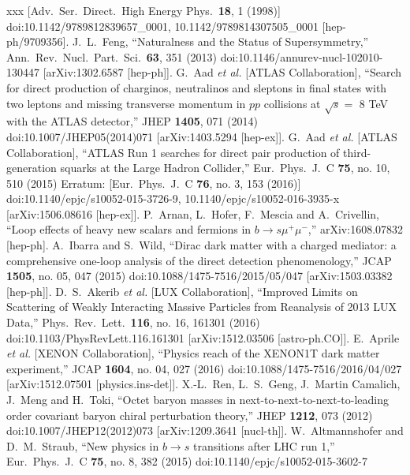 \begin{thebibliography}{xxx}
  [Adv.\ Ser.\ Direct.\ High Energy Phys.\  {\bf 18}, 1 (1998)]
  doi:10.1142/9789812839657\_0001, 10.1142/9789814307505\_0001
  [hep-ph/9709356].
    J.~L.~Feng,
  ``Naturalness and the Status of Supersymmetry,''
  Ann.\ Rev.\ Nucl.\ Part.\ Sci.\  {\bf 63}, 351 (2013)
  doi:10.1146/annurev-nucl-102010-130447
  [arXiv:1302.6587 [hep-ph]].
    G.~Aad {\it et al.} [ATLAS Collaboration],
  ``Search for direct production of charginos, neutralinos and sleptons in final states with two leptons and missing transverse momentum in $pp$ collisions at $\sqrt{s} =$ 8 TeV with the ATLAS detector,''
  JHEP {\bf 1405}, 071 (2014)
  doi:10.1007/JHEP05(2014)071
  [arXiv:1403.5294 [hep-ex]].
    G.~Aad {\it et al.} [ATLAS Collaboration],
  ``ATLAS Run 1 searches for direct pair production of third-generation squarks at the Large Hadron Collider,''
  Eur.\ Phys.\ J.\ C {\bf 75}, no. 10, 510 (2015)
  Erratum: [Eur.\ Phys.\ J.\ C {\bf 76}, no. 3, 153 (2016)]
  doi:10.1140/epjc/s10052-015-3726-9, 10.1140/epjc/s10052-016-3935-x
  [arXiv:1506.08616 [hep-ex]].
   P.~Arnan, L.~Hofer, F.~Mescia and A.~Crivellin,
  ``Loop effects of heavy new scalars and fermions in $b\to s\mu^+\mu^-$,''
  arXiv:1608.07832 [hep-ph].
    A.~Ibarra and S.~Wild,
  ``Dirac dark matter with a charged mediator: a comprehensive one-loop analysis of the direct detection phenomenology,''
  JCAP {\bf 1505}, no. 05, 047 (2015)
  doi:10.1088/1475-7516/2015/05/047
  [arXiv:1503.03382 [hep-ph]].
    D.~S.~Akerib {\it et al.} [LUX Collaboration],
  ``Improved Limits on Scattering of Weakly Interacting Massive Particles from Reanalysis of 2013 LUX Data,''
  Phys.\ Rev.\ Lett.\  {\bf 116}, no. 16, 161301 (2016)
  doi:10.1103/PhysRevLett.116.161301
  [arXiv:1512.03506 [astro-ph.CO]].
    E.~Aprile {\it et al.} [XENON Collaboration],
  ``Physics reach of the XENON1T dark matter experiment,''
  JCAP {\bf 1604}, no. 04, 027 (2016)
  doi:10.1088/1475-7516/2016/04/027
  [arXiv:1512.07501 [physics.ins-det]].
    X.-L.~Ren, L.~S.~Geng, J.~Martin Camalich, J.~Meng and H.~Toki,
  ``Octet baryon masses in next-to-next-to-next-to-leading order covariant baryon chiral perturbation theory,''
  JHEP {\bf 1212}, 073 (2012)
  doi:10.1007/JHEP12(2012)073
  [arXiv:1209.3641 [nucl-th]].
    W.~Altmannshofer and D.~M.~Straub,
  ``New physics in $b\rightarrow s$ transitions after LHC run 1,''
  Eur.\ Phys.\ J.\ C {\bf 75}, no. 8, 382 (2015)
  doi:10.1140/epjc/s10052-015-3602-7

\end{thebibliography}
